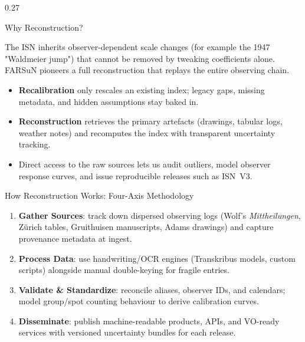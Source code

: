 \documentclass[final]{beamer}
\newcommand{\key}[1]{\textbf{\color{accent}#1}}
\newcommand{\callout}[2]{%
  \begin{beamercolorbox}[wd=\linewidth,sep=0.6em,rounded=true,shadow=false]{block body}%
    {\bfseries\color{royal}#1}\\[-0.3em]
    {\footnotesize #2}%
  \end{beamercolorbox}%
}
\newenvironment{tightblock}[1]{%
  \begin{block}{#1}\vspace{0.6em}
}{\vspace{0.6em}\end{block}}
\begin{document}
\begin{frame}[t]
\begin{columns}[t,totalwidth=0.98\paperwidth]
\begin{column}{0.27\paperwidth}
\begin{tightblock}{Why Reconstruction?}
  The ISN inherits observer-dependent scale changes (for example the 1947 "Waldmeier jump") that cannot be removed by tweaking coefficients alone. FARSuN pioneers a full reconstruction that replays the entire observing chain.
\begin{itemize}
  \item \textbf{Recalibration} only rescales an existing index; legacy gaps, missing metadata, and hidden assumptions stay baked in.
  \item \textbf{Reconstruction} retrieves the primary artefacts (drawings, tabular logs, weather notes) and recomputes the index with transparent uncertainty tracking.
  \item Direct access to the raw sources lets us audit outliers, model observer response curves, and issue reproducible releases such as ISN~V3.
\end{itemize}
\end{tightblock}


\begin{tightblock}{How Reconstruction Works: Four-Axis Methodology}
\begin{enumerate}
  \item \key{Gather Sources}: track down dispersed observing logs (Wolf's \emph{Mittheilungen}, Zürich tables, Gruithuisen manuscripts, Adams drawings) and capture provenance metadata at ingest.
  \item \key{Process Data}: use handwriting/OCR engines (Transkribus models, custom scripts) alongside manual double-keying for fragile entries.
  \item \key{Validate \& Standardize}: reconcile aliases, observer IDs, and calendars; model group/spot counting behaviour to derive calibration curves.
  \item \key{Disseminate}: publish machine-readable products, APIs, and VO-ready services with versioned uncertainty bundles for each release.
\end{enumerate}
\end{tightblock}


\end{column}
\end{columns}
\end{frame}
\end{document}
